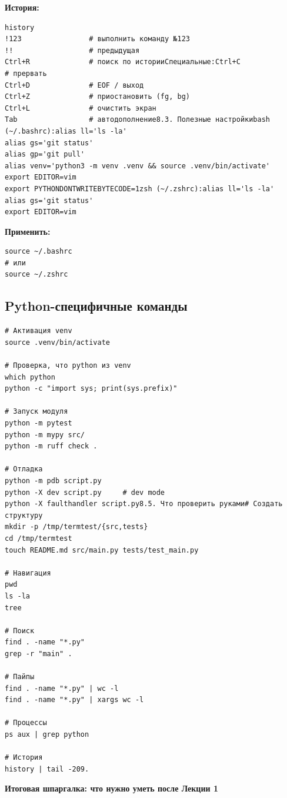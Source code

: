 \textbf{История:}
\begin{lstlisting}
history
!123                # выполнить команду №123
!!                  # предыдущая
Ctrl+R              # поиск по историиСпециальные:Ctrl+C              # прервать
Ctrl+D              # EOF / выход
Ctrl+Z              # приостановить (fg, bg)
Ctrl+L              # очистить экран
Tab                 # автодополнение8.3. Полезные настройкиbash (~/.bashrc):alias ll='ls -la'
alias gs='git status'
alias gp='git pull'
alias venv='python3 -m venv .venv && source .venv/bin/activate'
export EDITOR=vim
export PYTHONDONTWRITEBYTECODE=1zsh (~/.zshrc):alias ll='ls -la'
alias gs='git status'
export EDITOR=vim
\end{lstlisting}

\textbf{Применить:}
\begin{lstlisting}
source ~/.bashrc
# или
source ~/.zshrc
\end{lstlisting}

\subsection{Python-специфичные команды}

\begin{lstlisting}
# Активация venv
source .venv/bin/activate

# Проверка, что python из venv
which python
python -c "import sys; print(sys.prefix)"

# Запуск модуля
python -m pytest
python -m mypy src/
python -m ruff check .

# Отладка
python -m pdb script.py
python -X dev script.py     # dev mode
python -X faulthandler script.py8.5. Что проверить руками# Создать структуру
mkdir -p /tmp/termtest/{src,tests}
cd /tmp/termtest
touch README.md src/main.py tests/test_main.py

# Навигация
pwd
ls -la
tree

# Поиск
find . -name "*.py"
grep -r "main" .

# Пайпы
find . -name "*.py" | wc -l
find . -name "*.py" | xargs wc -l

# Процессы
ps aux | grep python

# История
history | tail -209.
\end{lstlisting}

\textbf{Итоговая шпаргалка: что нужно уметь после Лекции 1}

